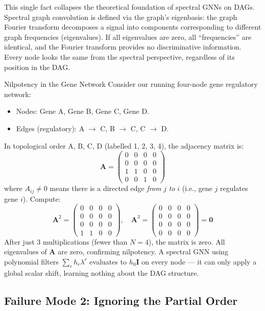 This single fact collapses the theoretical foundation of spectral GNNs on DAGs.
Spectral graph convolution is defined via the graph's eigenbasis: the graph
Fourier transform decomposes a signal into components corresponding to
different graph frequencies (eigenvalues). If all eigenvalues are zero, all
``frequencies'' are identical, and the Fourier transform provides no
discriminative information. Every node looks the same from the spectral
perspective, regardless of its position in the DAG.

\begin{examplebox}{Nilpotency in the Gene Network}
Consider our running four-node gene regulatory network:
\begin{itemize}[noitemsep]
    \item Nodes: Gene A, Gene B, Gene C, Gene D.
    \item Edges (regulatory): A $\to$ C, B $\to$ C, C $\to$ D.
\end{itemize}
In topological order A, B, C, D (labelled 1, 2, 3, 4), the adjacency matrix is:
\[
    \mathbf{A} = \begin{pmatrix} 0 & 0 & 0 & 0 \\ 0 & 0 & 0 & 0 \\ 1 & 1 & 0 & 0 \\ 0 & 0 & 1 & 0 \end{pmatrix}
\]
where $A_{ij} \neq 0$ means there is a directed edge \emph{from} $j$ \emph{to}
$i$ (i.e., gene $j$ regulates gene $i$). Compute:
\[
    \mathbf{A}^2 = \begin{pmatrix} 0&0&0&0\\0&0&0&0\\0&0&0&0\\1&1&0&0 \end{pmatrix}, \quad
    \mathbf{A}^3 = \begin{pmatrix} 0&0&0&0\\0&0&0&0\\0&0&0&0\\0&0&0&0 \end{pmatrix} = \mathbf{0}
\]
After just 3 multiplications (fewer than $N = 4$), the matrix is zero.
All eigenvalues of $\mathbf{A}$ are zero, confirming nilpotency. A spectral
GNN using polynomial filters $\sum_r h_r \lambda^r$ evaluates to $h_0 \mathbf{I}$
on every node --- it can only apply a global scalar shift, learning nothing about
the DAG structure.
\end{examplebox}

\subsection{Failure Mode 2: Ignoring the Partial Order}

